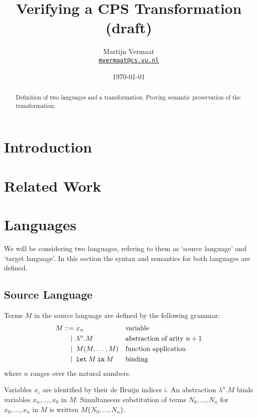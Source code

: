 \documentclass[a4paper,11pt]{article}
\title{Verifying a CPS Transformation (draft)}
\author{
  Martijn Vermaat\\[0.3em]
  \href{mailto:mvermaat@cs.vu.nl}{\texttt{mvermaat@cs.vu.nl}}
}
\date{\today}
\begin{document}
\maketitle


\begin{abstract}
  Definition of two languages and a transformation. Proving semantic
  preservation of the transformation.
\end{abstract}


\section{Introduction}\label{sec:introduction}


\section{Related Work}\label{sec:related}


\section{Languages}\label{sec:languages}

We will be considering two languages, refering to them as `source language' and
`target language'. In this section the syntax and semantics for both languages
are defined.

\subsection{Source Language}

Terms $M$ in the source language are defined by the following grammar:
\begin{align*}
M ::=             &\; x_{n}
                  && \text{variable} \\
\llap{\textbar\:} &\; \lambda^{n}.M
                  && \text{abstraction of arity $n+1$} \\
\llap{\textbar\:} &\; M(M, \ldots, M)
                  && \text{function application} \\
\llap{\textbar\:} &\; \texttt{let} \: M \: \texttt{in} \: M
                  && \text{binding}
\end{align*}
where $n$ ranges over the natural numbers.

Variables $x_{i}$ are identified by their de Bruijn indices $i$.
An abstraction $\lambda^{n}.M$ binds variables $x_{n}, \ldots, x_{0}$ in $M$.
Simultaneous substitution of terms $N_{0}, \ldots, N_{n}$ for
$x_{0}, \ldots, x_{n}$ in $M$ is written $M\{N_{0}, \ldots, N_{n}\}$.
\end{document}

